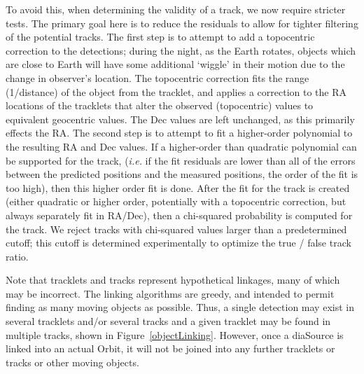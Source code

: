 To avoid this, when determining the validity of a track, we now
require stricter tests.  The primary goal here is to reduce the
residuals to allow for tighter filtering of the potential tracks. The
first step is to attempt to add a topocentric correction to the
detections; during the night, as the Earth rotates, objects which are
close to Earth will have some additional `wiggle' in their motion due
to the change in observer's location.  The topocentric correction fits
the range (1/distance) of the object from the tracklet, and applies a
correction to the RA locations of the tracklets that alter the
observed (topocentric) values to equivalent geocentric values. The Dec
values are left unchanged, as this primarily effects the RA. The
second step is to attempt to fit a higher-order polynomial to the
resulting RA and Dec values. If a higher-order than quadratic
polynomial can be supported for the track, ({\it i.e.} if
the fit residuals are lower than all of the errors between the
predicted positions and the measured positions, the order
of the fit is too high), then this higher
order fit is done. After the fit for the track is
created (either quadratic or higher order, potentially with a
topocentric correction, but always separately fit in RA/Dec), then a
chi-squared probability is computed for the track. We reject tracks
with chi-squared values larger than a predetermined cutoff; this
cutoff is determined experimentally to optimize the true / false track
ratio. 

Note that tracklets and tracks represent hypothetical linkages, many
of which may be incorrect.  The linking algorithms are greedy, and
intended to permit finding as many moving objects as possible. Thus, a
single detection may exist in several tracklets and/or several tracks
and a given tracklet may be found in multiple tracks, shown in
Figure~\ref{objectLinking}.  However, once a diaSource is linked into
an actual Orbit, it will not be joined into any further tracklets or
tracks or other moving objects. 


